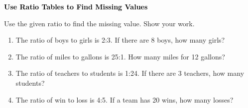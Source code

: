 \documentclass[12pt, letterpaper, fleqn]{article}
\begin{document}
\newpage

\begin{tcolorbox}[colback=customteal!20]
\large\textcolor{black}{\textbf{Use Ratio Tables to Find Missing Values}}
\end{tcolorbox}

\noindent
Use the given ratio to find the missing value. Show your work.

\vspace{3mm}

\begin{enumerate}[itemsep=1.8cm, leftmargin=0.6cm]

\item The ratio of boys to girls is 2:3. If there are 8 boys, how many girls?

\vspace{2cm}

\item The ratio of miles to gallons is 25:1. How many miles for 12 gallons?

\vspace{2cm}

\item The ratio of teachers to students is 1:24. If there are 3 teachers, how many students?

\vspace{2cm}

\item The ratio of win to loss is 4:5. If a team has 20 wins, how many losses?

\vspace{2cm}

\end{enumerate}
\end{document}
